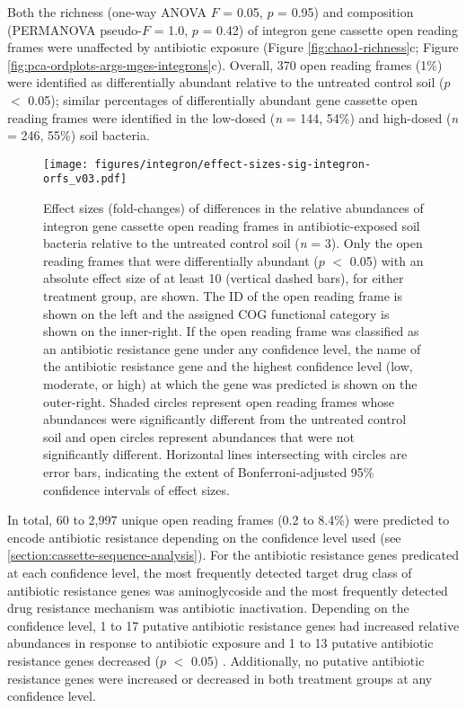 Both the richness (one-way ANOVA $F$ = 0.05, $p$ = 0.95) and composition (PERMANOVA pseudo-$F$ = 1.0, $p$ = 0.42) of integron gene cassette open reading frames were unaffected by antibiotic exposure (Figure \ref{fig:chao1-richness}c; Figure \ref{fig:pca-ordplots-args-mges-integrons}c).
Overall, 370 open reading frames (1\%) were identified as differentially abundant relative to the untreated control soil ($p$ $<$ 0.05); similar percentages of differentially abundant gene cassette open reading frames were identified in the low-dosed (\textit{n} = 144, 54\%) and high-dosed (\textit{n} = 246, 55\%) soil bacteria.

\begin{figure}[htpb]
	\centering
		\texttt{[image: figures/integron/effect-sizes-sig-integron-orfs\_v03.pdf]}
	\caption[Effect sizes of differentially abundant integron gene cassette open reading frames.]{
		Effect sizes (fold-changes) of differences in the relative abundances of integron gene cassette open reading frames in antibiotic-exposed soil bacteria relative to the untreated control soil (\textit{n} = 3).
		Only the open reading frames that were differentially abundant ($p$ $<$ 0.05) with an absolute effect size of at least 10 (vertical dashed bars), for either treatment group, are shown.
		The ID of the open reading frame is shown on the left and the assigned COG functional category is shown on the inner-right.
		If the open reading frame was classified as an antibiotic resistance gene under any confidence level, the name of the antibiotic resistance gene and the highest confidence level (low, moderate, or high) at which the gene was predicted is shown on the outer-right.
		Shaded circles represent open reading frames whose abundances were significantly different from the untreated control soil and open circles represent abundances that were not significantly different.
		Horizontal lines intersecting with circles are error bars, indicating the extent of Bonferroni-adjusted 95\% confidence intervals of effect sizes.
	}
	\label{fig:effect-sizes-sig-integron-orfs}
\end{figure}

In total, 60 to 2,997 unique open reading frames (0.2 to 8.4\%) were predicted to encode antibiotic resistance depending on the confidence level used (see \ref{section:cassette-sequence-analysis}).
For the antibiotic resistance genes predicated at each confidence level, the most frequently detected target drug class of antibiotic resistance genes was aminoglycoside and the most frequently detected drug resistance mechanism was antibiotic inactivation.
Depending on the confidence level, 1 to 17 putative antibiotic resistance genes had increased relative abundances in response to antibiotic exposure and 1 to 13 putative antibiotic resistance genes decreased ($p$ $<$ 0.05) \dummysuptab.
Additionally, no putative antibiotic resistance genes were increased or decreased in both treatment groups at any confidence level.

